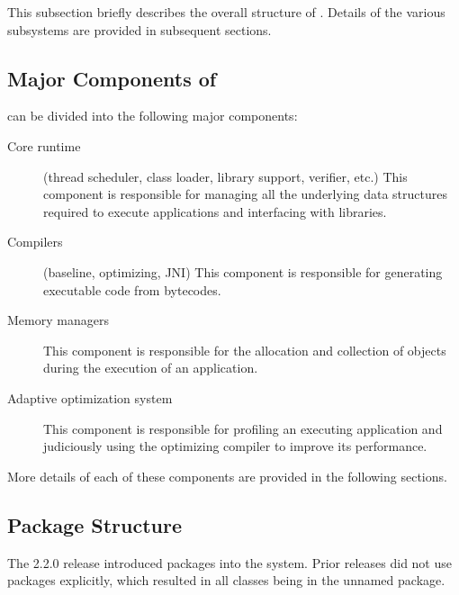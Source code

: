 This subsection briefly describes the overall structure of \jrvm.\@
Details of the various subsystems are provided in subsequent
sections.  

\subsection{Major Components of \jrvm}


\jrvm{} can be divided into the following major components:
\begin{description}
\item[Core runtime] (thread scheduler, class loader, library support,
verifier, etc.) This component is responsible for 
managing all the underlying data
structures required to execute applications and interfacing with
libraries.

\item[Compilers] (baseline, optimizing, JNI) This component is
responsible for generating executable code from bytecodes.

\item[Memory managers] This component is responsible for the
allocation and collection of objects during the execution of an
application. 

\item[Adaptive optimization system] This component is responsible
for profiling an executing application
and judiciously using the optimizing compiler to
improve its performance.
\end{description}

More details of each of these components are provided in the following sections.

\subsection{Package Structure}
The 2.2.0 release introduced packages into the system.  Prior releases
did not use packages explicitly, which resulted in all classes being in
the unnamed package.  

